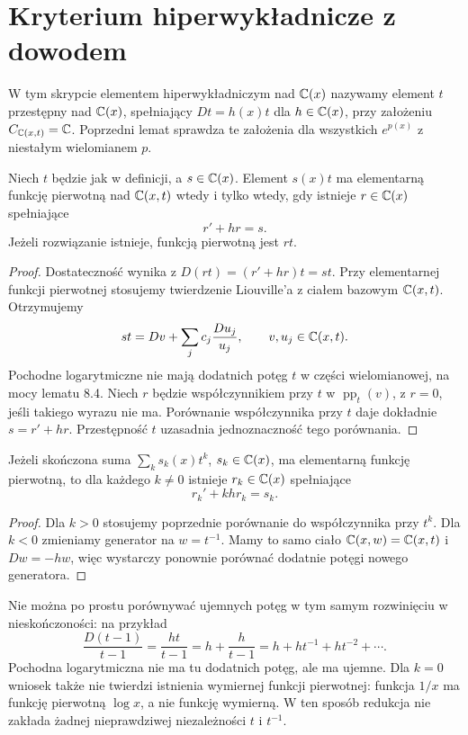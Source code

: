 \section{Kryterium hiperwykładnicze z dowodem}

\begin{definicja}
W tym skrypcie elementem hiperwykładniczym nad $\mathbb{C}(x)$ nazywamy element $t$ przestępny nad $\mathbb{C}(x)$, spełniający $Dt=h(x)t$ dla $h\in\mathbb{C}(x)$, przy założeniu $C_{\mathbb{C}(x,t)}=\mathbb{C}$. Poprzedni lemat sprawdza te założenia dla wszystkich $e^{p(x)}$ z niestałym wielomianem $p$.
\end{definicja}

\begin{twierdzenie}
Niech $t$ będzie jak w definicji, a $s\in\mathbb{C}(x)$. Element $s(x)t$ ma elementarną funkcję pierwotną nad $\mathbb{C}(x,t)$ wtedy i tylko wtedy, gdy istnieje $r\in\mathbb{C}(x)$ spełniające
\begin{equation}\label{eq:hyperexp}
r'+hr=s.
\end{equation}
Jeżeli rozwiązanie istnieje, funkcją pierwotną jest $rt$.
\end{twierdzenie}
\begin{proof}
Dostateczność wynika z $D(rt)=(r'+hr)t=st$. Przy elementarnej funkcji pierwotnej stosujemy twierdzenie Liouville'a z ciałem bazowym $\mathbb{C}(x,t)$. Otrzymujemy
\[
st=Dv+\sum_j c_j\frac{Du_j}{u_j},\qquad v,u_j\in\mathbb{C}(x,t).
\]
Pochodne logarytmiczne nie mają dodatnich potęg $t$ w części wielomianowej, na mocy lematu 8.4. Niech $r$ będzie współczynnikiem przy $t$ w $\operatorname{pp}_t(v)$, z $r=0$, jeśli takiego wyrazu nie ma. Porównanie współczynnika przy $t$ daje dokładnie $s=r'+hr$. Przestępność $t$ uzasadnia jednoznaczność tego porównania.
\end{proof}

\begin{wniosek}
Jeżeli skończona suma $\sum_k s_k(x)t^k$, $s_k\in\mathbb{C}(x)$, ma elementarną funkcję pierwotną, to dla każdego $k\ne0$ istnieje $r_k\in\mathbb{C}(x)$ spełniające
\[
r_k'+khr_k=s_k.
\]
\end{wniosek}
\begin{proof}
Dla $k>0$ stosujemy poprzednie porównanie do współczynnika przy $t^k$. Dla $k<0$ zmieniamy generator na $w=t^{-1}$. Mamy to samo ciało $\mathbb{C}(x,w)=\mathbb{C}(x,t)$ i $Dw=-hw$, więc wystarczy ponownie porównać dodatnie potęgi nowego generatora.
\end{proof}

Nie można po prostu porównywać ujemnych potęg w tym samym rozwinięciu w nieskończoności: na przykład
\[
\frac{D(t-1)}{t-1}=\frac{ht}{t-1}
=h+\frac{h}{t-1}=h+ht^{-1}+ht^{-2}+\cdots.
\]
Pochodna logarytmiczna nie ma tu dodatnich potęg, ale ma ujemne. Dla $k=0$ wniosek także nie twierdzi istnienia wymiernej funkcji pierwotnej: funkcja $1/x$ ma funkcję pierwotną $\log x$, a nie funkcję wymierną. W ten sposób redukcja nie zakłada żadnej nieprawdziwej niezależności $t$ i $t^{-1}$.


